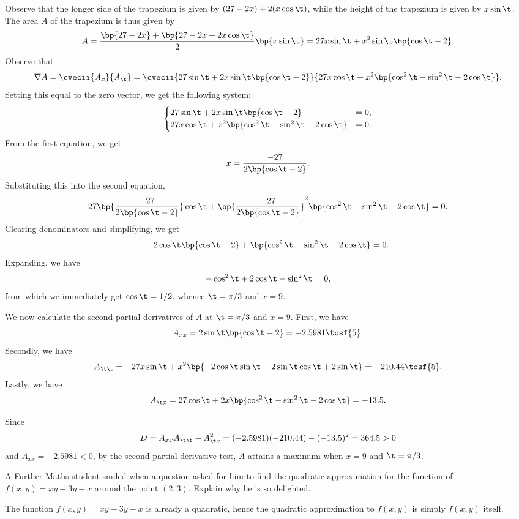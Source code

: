 \begin{solution}[2]
    Observe that the longer side of the trapezium is given by $(27 - 2x) + 2(x\cos \t)$, while the height of the trapezium is given by $x \sin \t$. The area $A$ of the trapezium is thus given by \[A = \frac{\bp{27-2x} + \bp{27-2x+2x\cos\t}}{2} \bp{x \sin \t} = 27x\sin \t + x^2 \sin \t \bp{\cos \t - 2}.\] Observe that \[\nabla A = \cvecii{A_x}{A_{\t}} = \cvecii{27\sin \t + 2x \sin \t \bp{\cos \t -2}}{27x \cos \t + x^2\bp{\cos^2 \t - \sin^2 \t - 2\cos \t}}.\] Setting this equal to the zero vector, we get the following system: \[\begin{cases}
            27\sin \t + 2x \sin \t \bp{\cos \t -2} &= 0,\\
            27x \cos \t + x^2\bp{\cos^2 \t - \sin^2 \t - 2\cos \t} &= 0.
        \end{cases}\]
    From the first equation, we get \[x = \frac{-27}{2\bp{\cos \t - 2}}.\] Substituting this into the second equation, \[27\bp{\frac{-27}{2\bp{\cos \t - 2}}}\cos \t + \bp{\frac{-27}{2\bp{\cos \t - 2}}}^2\bp{\cos^2 \t - \sin^2 \t - 2\cos \t} = 0.\] Clearing denominators and simplifying, we get \[-2\cos\t \bp{\cos \t - 2} + \bp{\cos^2\t - \sin^2 \t -2\cos\t} = 0.\] Expanding, we have \[-\cos^2 \t + 2\cos \t - \sin^2 \t = 0,\] from which we immediately get $\cos \t = 1/2$, whence $\t = \pi/3$ and $x = 9$.

    We now calculate the second partial derivatives of $A$ at $\t = \pi/3$ and $x = 9$. First, we have \[A_{xx} = 2\sin\t \bp{\cos \t - 2} = -2.5981 \tosf{5}.\] Secondly, we have \[A_{\t\t} = -27x\sin\t + x^2\bp{-2\cos\t\sin\t -2\sin\t\cos\t+2\sin\t} = -210.44 \tosf{5}.\] Lastly, we have \[A_{\t x} = 27\cos \t + 2x\bp{\cos^2 \t - \sin^2 \t -2\cos \t} = -13.5.\]

    Since \[D = A_{xx} A_{\t\t} - A_{\t x}^2 = (-2.5981)(-210.44) - (-13.5)^2 = 364.5 > 0\] and $A_{xx} = -2.5981 < 0$, by the second partial derivative test, $A$ attains a maximum when $x = 9$ and $\t = \pi/3$.
\end{solution}

\begin{problem}
    A Further Maths student smiled when a question asked for him to find the quadratic approximation for the function of $f(x, y) = xy - 3y - x$ around the point $(2, 3)$. Explain why he is so delighted.
\end{problem}
\begin{solution}
    The function $f(x, y) = xy - 3y - x$ is already a quadratic, hence the quadratic approximation to $f(x, y)$ is simply $f(x, y)$ itself.
\end{solution}

